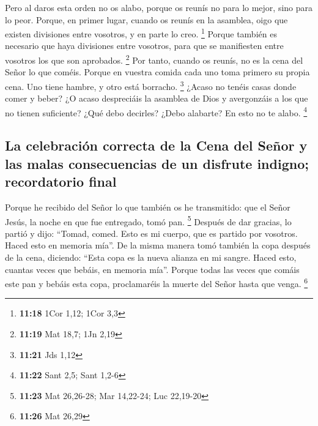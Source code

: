  Pero al daros esta orden no os alabo, porque os reunís
no para lo mejor, sino para lo peor.  Porque, en primer
lugar, cuando os reunís en la asamblea, oigo que existen divisiones
entre vosotros, y en parte lo creo. \footnote{\textbf{11:18} 1Cor 1,12;
  1Cor 3,3}  Porque también es necesario que haya
divisiones entre vosotros, para que se manifiesten entre vosotros los
que son aprobados. \footnote{\textbf{11:19} Mat 18,7; 1Jn 2,19}
 Por tanto, cuando os reunís, no es la cena del Señor lo
que coméis.  Porque en vuestra comida cada uno toma
primero su propia cena. Uno tiene hambre, y otro está borracho.
\footnote{\textbf{11:21} Jds 1,12}  ¿Acaso no tenéis
casas donde comer y beber? ¿O acaso despreciáis la asamblea de Dios y
avergonzáis a los que no tienen suficiente? ¿Qué debo decirles? ¿Debo
alabarte? En esto no te alabo. \footnote{\textbf{11:22} Sant 2,5; Sant
  1,2-6}

\hypertarget{la-celebraciuxf3n-correcta-de-la-cena-del-seuxf1or-y-las-malas-consecuencias-de-un-disfrute-indigno-recordatorio-final}{%
\subsection{La celebración correcta de la Cena del Señor y las malas
consecuencias de un disfrute indigno; recordatorio
final}\label{la-celebraciuxf3n-correcta-de-la-cena-del-seuxf1or-y-las-malas-consecuencias-de-un-disfrute-indigno-recordatorio-final}}

 Porque he recibido del Señor lo que también os he
transmitido: que el Señor Jesús, la noche en que fue entregado, tomó
pan. \footnote{\textbf{11:23} Mat 26,26-28; Mar 14,22-24; Luc 22,19-20}
 Después de dar gracias, lo partió y dijo: ``Tomad,
comed. Esto es mi cuerpo, que es partido por vosotros. Haced esto en
memoria mía''.  De la misma manera tomó también la copa
después de la cena, diciendo: ``Esta copa es la nueva alianza en mi
sangre. Haced esto, cuantas veces que bebáis, en memoria mía''.
 Porque todas las veces que comáis este pan y bebáis esta
copa, proclamaréis la muerte del Señor hasta que venga. \footnote{\textbf{11:26}
  Mat 26,29}

